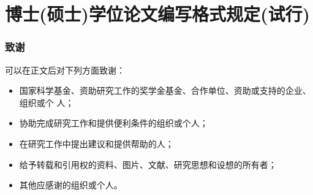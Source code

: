 \documentclass[phd,nobackinfo]{scutthesis}
\begin{document}
\appendix

\chapter{博士(硕士)学位论文编写格式规定(试行)}


\subsection{致谢}

可以在正文后对下列方面致谢：

\begin{itemize}
\item 国家科学基金、资助研究工作的奖学金基金、合作单位、资助或支持的企业、组织或个
人；
\item 协助完成研究工作和提供便利条件的组织或个人；
\item 在研究工作中提出建议和提供帮助的人；
\item 给予转载和引用权的资料、图片、文献、研究思想和设想的所有者；
\item 其他应感谢的组织或个人。
\end{itemize}

\nocite{*}

\end{document}
